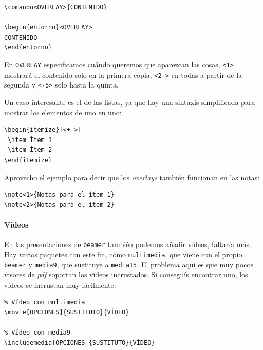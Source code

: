 \begin{lstlisting}[language={[latex]tex}]
\comando<OVERLAY>{CONTENIDO}

\begin{entorno}<OVERLAY>
CONTENIDO
\end{entorno}
\end{lstlisting}

En \lstinline!OVERLAY! especificamos cuándo queremos que aparezcan las
cosas, \lstinline!<1>! mostrará el contenido solo en la primera copia;
\lstinline!<2->! en todas a partir de la segunda y \lstinline!<-5>! solo
hasta la quinta.

Un caso interesante es el de las listas, ya que hay una sintaxis
simplificada para mostrar los elementos de uno en uno:

\begin{lstlisting}[language={[latex]tex}]
\begin{itemize}[<+->]
 \item Ítem 1
 \item Ítem 2
\end{itemize}
\end{lstlisting}

Aprovecho el ejemplo para decir que los \emph{overlays} también
funcionan en las notas:

\begin{lstlisting}[language={[latex]tex}]
\note<1>{Notas para el ítem 1}
\note<2>{Notas para el ítem 2}
\end{lstlisting}

\paragraph{Vídeos}
En las presentaciones de \lstinline!beamer! también podemos añadir
vídeos, faltaría más. Hay varios paquetes con este fin, como
\lstinline!multimedia!, que viene con el propio \lstinline!beamer! y
\href{https://www.ctan.org/pkg/media9}{\lstinline!media9!}, que
sustituye a
\href{https://www.ctan.org/pkg/movie15}{\lstinline!media15!}. El
problema aquí es que muy pocos visores de \emph{pdf} soportan los vídeos
incrustados. Si conseguís encontrar uno, los vídeos se incrustan muy
fácilmente:

\begin{lstlisting}
% Vídeo con multimedia
\movie[OPCIONES]{SUSTITUTO}{VÍDEO}

% Vídeo con media9
\includemedia[OPCIONES]{SUSTITUTO}{VÍDEO}
\end{lstlisting}


